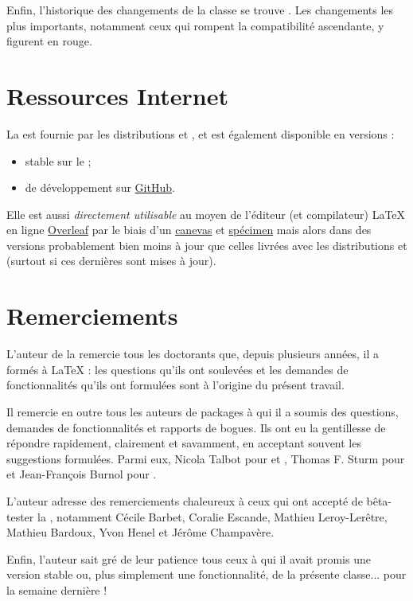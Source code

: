 Enfin, l'historique des changements de la classe se trouve .
Les changements les plus importants, notamment ceux qui rompent la compatibilité
ascendante, y figurent en rouge.

\section{Ressources Internet}
\label{sec-ressources-internet}
%

La \yatCl{} est fournie par les distributions \texlive{} et \miktex{}, et est
également disponible en versions :
\begin{itemize}
\item stable sur le \href{https://ctan.org/pkg/yathesis}{} ;
\item de développement sur \href{https://github.com/dbitouze/yathesis}{GitHub}.
\end{itemize}

Elle est aussi \emph{directement utilisable} au moyen de l'éditeur (et compilateur)
\LaTeX{} en ligne%
%
%
%
%
\href{https://www.overleaf.com/}{Overleaf} par le biais d'un
\href{https://www.overleaf.com/read/hsgnfrkzcmbh}{canevas} et
\href{https://www.overleaf.com/read/fsmqshrkdvgj}{spécimen}\detailsspecimencanevas{}
mais alors dans des versions probablement bien moins à jour que celles livrées
avec les distributions \texlive{} et \miktex{} (surtout si ces dernières sont
mises à jour).

\section{Remerciements}
\label{sec-remerciements}

L'auteur de la \yatCl{} remercie tous les doctorants que, depuis plusieurs
années, il a formés à \LaTeX{} : les questions qu'ils ont soulevées et les
demandes de fonctionnalités qu'ils ont formulées sont à l'origine du présent
travail.

Il remercie en outre tous les auteurs de packages à qui il a soumis  des questions, demandes de fonctionnalités et rapports
de bogues. Ils ont eu la gentillesse de répondre rapidement, clairement et
savamment, en acceptant souvent les suggestions formulées. Parmi eux, Nicola
Talbot pour  et , Thomas F. Sturm
pour  et Jean-François Burnol pour .

L'auteur adresse des remerciements chaleureux à ceux qui ont accepté de
bêta-tester la \yatCl{}, notamment Cécile Barbet, Coralie Escande, Mathieu
Leroy-Lerêtre, Mathieu Bardoux, Yvon Henel et Jérôme Champavère.

Enfin, l'auteur sait gré de leur patience tous ceux à qui il avait promis une
version stable ou, plus simplement une fonctionnalité, de la présente
classe... pour la semaine dernière !

